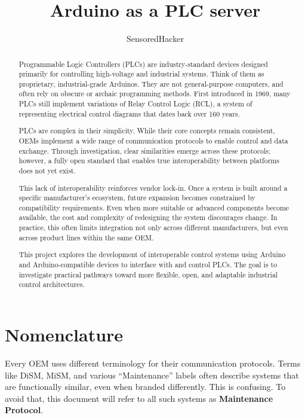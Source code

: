 \documentclass[12pt]{article}
\title{Arduino as a PLC server}
\author{SensoredHacker}
\begin{document}
\maketitle

\begin{abstract}
Programmable Logic Controllers (PLCs) are industry-standard devices designed primarily for controlling high-voltage and industrial systems. Think of them as proprietary, industrial-grade Arduinos. They are not general-purpose computers, and often rely on obscure or archaic programming methods. First introduced in 1969, many PLCs still implement variations of Relay Control Logic (RCL), a system of representing electrical control diagrams that dates back over 160 years.

PLCs are complex in their simplicity. While their core concepts remain consistent, OEMs implement a wide range of communication protocols to enable control and data exchange. Through investigation, clear similarities emerge across these protocols; however, a fully open standard that enables true interoperability between platforms does not yet exist.

This lack of interoperability reinforces vendor lock-in. Once a system is built around a specific manufacturer’s ecosystem, future expansion becomes constrained by compatibility requirements. Even when more suitable or advanced components become available, the cost and complexity of redesigning the system discourages change. In practice, this often limits integration not only across different manufacturers, but even across product lines within the same OEM.

This project explores the development of interoperable control systems using Arduino and Arduino-compatible devices to interface with and control PLCs. The goal is to investigate practical pathways toward more flexible, open, and adaptable industrial control architectures. 

\end{abstract}

\section*{Nomenclature}

Every OEM uses different terminology for their communication protocols. Terms like DiSM, MiSM, and various “Maintenance” labels often describe systems that are functionally similar, even when branded differently. This is confusing. To avoid that, this document will refer to all such systems as \textbf{Maintenance Protocol}.
\end{document}

